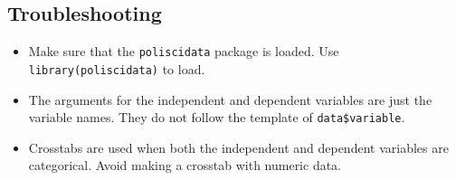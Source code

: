\documentclass[]{book}
\begin{document}
\subsection{Troubleshooting}\label{troubleshooting-3}

\begin{itemize}
\item
  Make sure that the \texttt{poliscidata} package is loaded. Use
  \texttt{library(poliscidata)} to load.
\item
  The arguments for the independent and dependent variables are just the
  variable names. They do not follow the template of
  \texttt{data\$variable}.
\item
  Crosstabs are used when both the independent and dependent variables
  are categorical. Avoid making a crosstab with numeric data.
\end{itemize}


\end{document}
